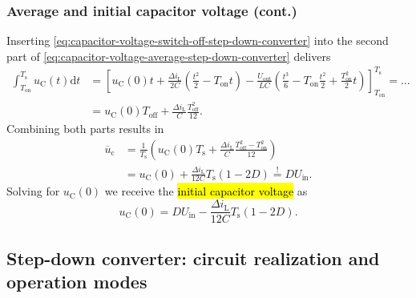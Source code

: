\begin{frame}
    \frametitle{Average and initial capacitor voltage (cont.)}
     Inserting \eqref{eq:capacitor-voltage-switch-off-step-down-converter} into the second part of \eqref{eq:capacitor-voltage-average-step-down-converter} delivers
    \begin{equation}
        \begin{split}
            \int_{T_\mathrm{on}}^{T_\mathrm{s}} u_\mathrm{C}(t) \mathrm{d}t &= \left[u_\mathrm{C}(0)t +  \frac{\Delta i_\mathrm{L}}{2C}(\frac{t^2}{2} - T_\mathrm{on}t) - \frac{U_\mathrm{out}}{LC}(\frac{t^3}{6} - T_\mathrm{on}\frac{t^2}{2} + \frac{T_\mathrm{on}^2}{2}t)  \right]_{T_\mathrm{on}}^{T_\mathrm{s}} =\ldots \\ &= u_\mathrm{C}(0) T_\mathrm{off} + \frac{\Delta i_\mathrm{L}}{C}\frac{T_\mathrm{off}^2}{12}.
        \end{split}
    \end{equation}
    Combining both parts results in
    \begin{equation}
    \begin{split}
        \overline{u}_\mathrm{c} &= \frac{1}{T_\mathrm{s}}\left(u_\mathrm{C}(0)T_\mathrm{s} + \frac{\Delta i_\mathrm{L}}{C}\frac{T_\mathrm{off}^2-T_\mathrm{on}^2}{12} \right)\\
                                & = u_\mathrm{C}(0) + \frac{\Delta i_\mathrm{L}}{12C}T_\mathrm{s}(1-2D) \stackrel{!}{=} D U_\mathrm{in}.
        \end{split}
    \end{equation}
    Solving for $u_\mathrm{C}(0)$ we receive the \hl{initial capacitor voltage} as
    \begin{equation}
        u_\mathrm{C}(0) = D U_\mathrm{in} - \frac{\Delta i_\mathrm{L}}{12C}T_\mathrm{s}(1-2D).
    \end{equation}
\end{frame}

\subsection{Step-down converter: circuit realization and operation modes}

